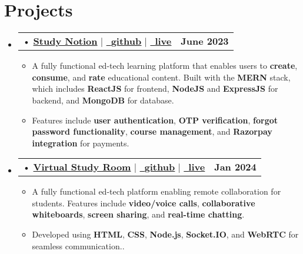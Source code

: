 \documentclass[letterpaper,11pt]{article}
\makeatletter
\newcommand{\resumeItem}[1]{
  \item\small{
	{#1 \vspace{-2pt}}
  }
}
\newcommand{\resumeProjectHeading}[2]{
	\item
	\begin{tabular*}{1.001\textwidth}{l@{\extracolsep{\fill}}r}
  	\small#1 & \textbf{\small #2}\\
	\end{tabular*}\vspace{-7pt}
}
\newcommand{\resumeSubHeadingListStart}{\begin{itemize}[leftmargin=0.0in, label={}]}
\newcommand{\resumeSubHeadingListEnd}{\end{itemize}}
\newcommand{\resumeItemListStart}{\begin{itemize}}
\newcommand{\resumeItemListEnd}{\end{itemize}\vspace{-5pt}}
\makeatother
\begin{document}
\section{Projects }
\begin{itemize}[leftmargin=0.12in, label={}]
	\vspace{-8pt}
	\resumeSubHeadingListStart
 
      \resumeProjectHeading
       {\hspace{-5pt}• {\href{https://studynotion-abhikant.vercel.app/}{\textbf{Study Notion}} } $|$  \href{https://github.com/abhikant12/Study-Notion}{\small \raisebox{-0.2\height}\faLink\  \underline{\textbf{github}}} $|$  \href{https://studynotion-abhikant.vercel.app/}{\small \raisebox{-0.2\height}\faLink\  \underline{\textbf{live}}} }{June 
        2023}
      	\resumeItemListStart
             \vspace{7pt}
        	\resumeItem{A fully functional ed-tech learning platform that enables users to \textbf{create}, \textbf{consume}, and \textbf{rate} educational content. Built with the \textbf{MERN} stack, which includes \textbf{ReactJS} for frontend, \textbf{NodeJS} and \textbf{ExpressJS} for backend, and \textbf{MongoDB} for database. }
          \vspace{4pt}
         \resumeItem{Features include \textbf{user authentication}, \textbf{OTP verification}, \textbf{forgot password functionality}, \textbf{course management}, and \textbf{Razorpay integration} for payments.}
         
      	\resumeItemListEnd
        \vspace{-4pt}

     \resumeProjectHeading
       {\hspace{-5pt}• {\href{https://virtual-study-room.onrender.com/}{\textbf{Virtual Study Room}} } $|$  \href{https://github.com/abhikant12/Virtual-Study-Room.git}{\small \raisebox{-0.2\height}\faLink\  \underline{\textbf{github}}} $|$  \href{https://virtual-study-room.onrender.com/}{\small \raisebox{-0.2\height}\faLink\  \underline{\textbf{live}}} }{Jan 
        2024}
      	\resumeItemListStart
             \vspace{7pt}
        	\resumeItem{ A fully functional ed-tech platform enabling remote collaboration for students. Features include  \textbf{video/voice calls}, \textbf{collaborative whiteboards}, \textbf{screen sharing}, and \textbf{real-time chatting}.}
        \vspace{4pt}
         \resumeItem{Developed using \textbf{HTML}, \textbf{CSS},\textbf{ Node.js}, \textbf{Socket.IO}, and \textbf{WebRTC} for seamless communication..}
         
      	\resumeItemListEnd
        \vspace{-5pt}
    
	\resumeSubHeadingListEnd
 \end{itemize} 
\vspace{-3pt}
  
\end{document}
